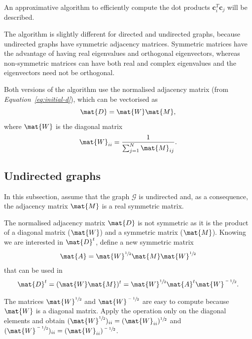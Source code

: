 \documentclass[12pt]{report}
\begin{document}
%
%


An approximative algorithm to efficiently compute the dot products $\bm{c}^T_i\bm{c}_j$
will be described.

The algorithm is slightly different for directed and undirected graphs, because
undirected graphs have symmetric adjacency matrices. Symmetric matrices have the
advantage of having real eigenvalues and orthogonal eigenvectors, whereas
non-symmetric matrices can have both real and complex eigenvalues and the
eigenvectors need not be orthogonal.

Both versions of the algorithm use the normalised adjacency matrix (from
\emph{Equation~\ref{eq:initial-d}}), which can be vectorised as
\begin{equation}
  \label{eq:d-vectorised}
  \mat{D} = \mat{W}\mat{M},
\end{equation}
where $\mat{W}$ is the diagonal matrix
\begin{equation}
  \label{eq:W}
  \mat{W}_{ii} = \frac{1}{\sum_{j=1}^N \mat{M}_{ij}}.
\end{equation}

%
%

\subsection{Undirected graphs}

In this subsection, assume that the graph $\mathcal{G}$ is undirected and, as a
consequence, the adjacency matrix $\mat{M}$ is a real symmetric matrix.

The normalised adjacency matrix $\mat{D}$ is not symmetric as it is the product
of a diagonal matrix ($\mat{W}$) and a symmetric matrix ($\mat{M}$). Knowing we
are interested in $\mat{D}^t$, define a new symmetric matrix
\begin{equation}
  \label{eq:a}
  \mat{A} = \mat{W}^{\sfrac{1}{2}}\mat{M}\mat{W}^{\sfrac{1}{2}}
\end{equation}
that can be used in
\begin{align}
  \label{eq:undirected-dt-waw}
  \mat{D}^t = (\mat{W}\mat{M})^t
      = \mat{W}^{\sfrac{1}{2}} \mat{A}^t \mat{W}^{\sfrac{-1}{2}}.
\end{align}

The matrices $\mat{W}^{\sfrac{1}{2}}$ and $\mat{W}^{\sfrac{-1}{2}}$ are easy to
compute because $\mat{W}$ is a diagonal matrix. Apply the operation only on the
diagonal elements and obtain $(\mat{W}^{\sfrac{1}{2}})_{ii} = (\mat{W}_{ii})^
{\sfrac{1}{2}}$ and $(\mat{W}^{\sfrac{-1}{2}})_{ii} = (\mat{W}_{ii})^
{\sfrac{-1}{2}}$.
\end{document}
